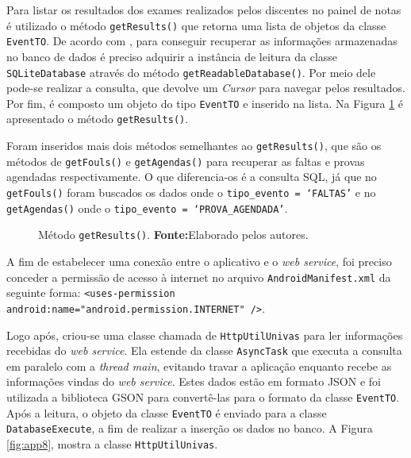 	\par Para listar os resultados dos exames realizados pelos discentes no painel
de notas é utilizado o método \texttt{getResults()} que retorna uma lista de
objetos da classe \texttt{EventTO}. De acordo com ,
para conseguir recuperar as informações armazenadas no banco de dados é preciso
adquirir a instância de leitura da classe \texttt{SQLiteDatabase} através do
método \texttt{getReadableDatabase()}. Por meio dele pode-se realizar a
consulta, que devolve um \textit{Cursor} para navegar pelos resultados. Por
fim, é composto um objeto do tipo \texttt{EventTO} e inserido na lista. Na
Figura \ref{fig:app7} é apresentado o método \texttt{getResults()}.

	\par Foram inseridos mais dois métodos semelhantes ao \texttt{getResults()},
que são os métodos de \texttt{getFouls()} e \texttt{getAgendas()} para
recuperar as faltas e provas agendadas respectivamente. O que diferencia-os é a
consulta SQL, já que no \texttt{getFouls()}  foram buscados os dados onde o
\texttt{tipo\_evento = ‘FALTAS'} e no \texttt{getAgendas()} onde o
\texttt{tipo\_evento = ‘PROVA\_AGENDADA'}.

	\begin{figure}[h!] 
		
		\caption[Método getResults()]{Método \texttt{getResults()}.
		\textbf{Fonte:}Elaborado pelos autores.}
		\label{fig:app7}
	\end{figure}
	
	\pagebreak
	
	\par A fim de estabelecer uma conexão entre o aplicativo e o \textit{web
service}, foi preciso conceder a permissão de acesso à internet no arquivo
\texttt{AndroidManifest.xml} da seguinte forma: \texttt{<uses-permission
android:name="android.permission.INTERNET" />}.

	\par Logo após, criou-se uma classe chamada de \texttt{HttpUtilUnivas} para ler
informações recebidas do \textit{web service}. Ela estende da classe
\texttt{AsyncTask} que executa a consulta em paralelo com a \textit{thread
main}, evitando travar a aplicação enquanto recebe as informações vindas do
\textit{web service}. Estes dados estão em formato JSON e foi utilizada a
biblioteca GSON para convertê-las para o formato da classe \texttt{EventTO}.
Após a leitura, o objeto da classe \texttt{EventTO} é enviado para a classe
\texttt{DatabaseExecute}, a fim de realizar a inserção os dados no banco. A
Figura \ref{fig:app8}, mostra a classe \texttt{HttpUtilUnivas}.

